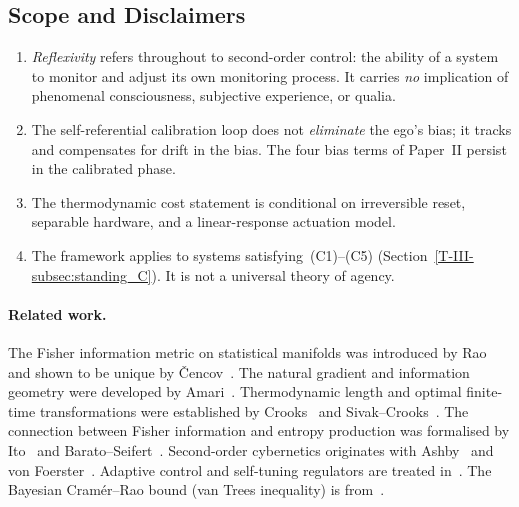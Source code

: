 \documentclass[12pt,a4paper,openany]{book}
\begin{document}
\subsection{Scope and Disclaimers}
\label{T-III-subsec:scope}

\begin{enumerate}
\item \emph{Reflexivity} refers throughout to
  second-order control: the ability of a system to
  monitor and adjust its own monitoring process.
  It carries \emph{no} implication of phenomenal
  consciousness, subjective experience, or qualia.
\item The self-referential calibration loop does not
  \emph{eliminate} the ego's bias; it tracks and
  compensates for drift in the bias.
  The four bias terms of Paper~II persist in the
  calibrated phase.
\item The thermodynamic cost statement is conditional on irreversible
  reset, separable hardware, and a linear-response actuation model.
\item The framework applies to systems
  satisfying~(C1)--(C5) (Section~\ref{T-III-subsec:standing_C}).
  It is not a universal theory of agency.
\end{enumerate}

\paragraph{Related work.}
The Fisher information metric on statistical manifolds was
introduced by Rao~\cite{Rao1945} and shown to be unique
by \v{C}encov~\cite{Cencov1982}.
The natural gradient and information geometry were developed
by Amari~\cite{Amari1998,AmariNagaoka2000}.
Thermodynamic length and optimal finite-time transformations
were established by
Crooks~\cite{Crooks2007} and
Sivak--Crooks~\cite{SivakCrooks2012}.
The connection between Fisher information and entropy
production was formalised by Ito~\cite{Ito2018} and
Barato--Seifert~\cite{BaratoSeifert2015}.
Second-order cybernetics originates with
Ashby~\cite{Ashby1956} and
von Foerster~\cite{vonFoerster2003}.
Adaptive control and self-tuning regulators are treated
in~\cite{AstromWittenmark1995}.
The Bayesian Cram\'{e}r--Rao bound (van Trees inequality)
is from~\cite{vanTrees1968}.
\end{document}
